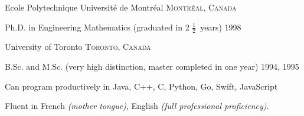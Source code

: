 \documentclass[12pt]{article} %
\begin{document}

\spacedhrule{-0.2em}{-0.4em} %



\headedsection %
{Ecole Polytechnique \bull Universit\'e de Montr\'eal }
{\textsc{Montr\'eal, Canada}} {

\headedsubsection %
{Ph.D. in Engineering Mathematics (graduated in 2 $\frac{1}{2}$~years)}
{1998}
{%
}
}


\headedsection %
{University of Toronto}
{\textsc{Toronto, Canada}} {

\headedsubsection %
{B.Sc. and M.Sc. (very high distinction, master completed in one year)}
{1994, 1995}
{%
}
}

\spacedhrule{0.5em}{-0.4em} %



\inlineheadsection %
{Can program productively in}
{Java, C++, C, Python, Go, Swift, JavaScript}
\vspace{0.1cm}



\inlineheadsection %
{Fluent in}
{French \textit{(mother tongue)}, English \textit{(full professional proficiency)}.}

\end{document}
